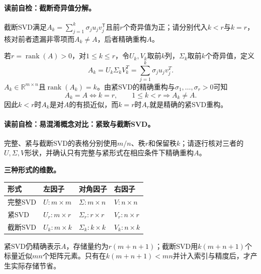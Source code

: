 \paragraph{读前自检：截断奇异值分解。}截断SVD满足$A_k=\sum_{j=1}^k\sigma_ju_jv_j^{\mathsf T}$且前$r$个奇异值为正；请分别代入$k<r$与$k=r$，核对前者遗漏非零项而$A_k\ne A$，后者精确重构$A$。\par

\begin{definition}[截断奇异值分解]\label{def:V4-C03-truncated-svd}
若$r=\operatorname{rank}(A)>0$，对$1\leq k\leq r$，令$U_k,V_k$取前$k$列，$\Sigma_k$取前$k$个奇异值，定义
\[
A_k=U_k\Sigma_kV_k^T
=\sum_{j=1}^{k}\sigma_ju_jv_j^T.
\]
$A_k\in\mathbb R^{m\times n}$且$\operatorname{rank}(A_k)=k$。由紧SVD的精确重构与$\sigma_1,\ldots,\sigma_r>0$可知
\[
A_k=A\iff k=r,\qquad
1\leq k<r\Longrightarrow A_k\ne A.
\]
因此$k<r$时$A_k$是对$A$的有损近似，而$k=r$时$A_r$就是精确的紧SVD重构。
\end{definition}

\paragraph{读前自检：易混淆概念对比：紧致与截断SVD。}完整、紧与截断SVD的表格分别使用$m/n$、秩$r$和保留秩$k$；请逐行核对三者的$U,\Sigma,V$形状，并确认只有完整与紧形式在相应条件下精确重构$A$。\par

\begin{comparisonbox}
\textbf{三种形式的维数。}\par\smallskip
\begin{tabularx}{\linewidth}{@{}l X X X@{}}
\toprule 形式 & 左因子 & 对角因子 & 右因子\\ \midrule
完整SVD & $U:m\times m$ & $\Sigma:m\times n$ & $V:n\times n$\\
紧SVD & $U_r:m\times r$ & $\Sigma_r:r\times r$ & $V_r:n\times r$\\
截断SVD & $U_k:m\times k$ & $\Sigma_k:k\times k$ & $V_k:n\times k$\\
\bottomrule
\end{tabularx}
\end{comparisonbox}

紧SVD仍精确表示$A$，存储量约为$r(m+n+1)$；截断SVD用$k(m+n+1)$个标量近似$mn$个矩阵元素。只有在$k(m+n+1)<mn$并计入索引与精度后，才产生实际存储节省。

